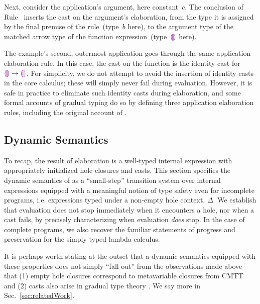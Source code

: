 Next, consider the application's argument, here constant~$c$.
%
The conclusion of Rule~ inserts the cast on the argument's
elaboration, from the type it is assigned by the final premise of the
rule~(type~$b$ here), to the argument type of the matched arrow type of the
function expression~(type~$\textcolor{violet}{\llparenthesis}\textcolor{violet}{\rrparenthesis}$ here).

The example's second, outermost application goes through the same
application elaboration rule.
%
In this case, the cast on the function is the identity cast for
$\textcolor{violet}{\llparenthesis}\textcolor{violet}{\rrparenthesis} \rightarrow \textcolor{violet}{\llparenthesis}\textcolor{violet}{\rrparenthesis}$.
%
For simplicity, we do not attempt to avoid the insertion of identity
casts in the core calculus; these will simply never fail during
evaluation.
%
However, it is safe in practice to eliminate such identity casts during
elaboration, and some formal accounts of gradual typing do so by defining
three application elaboration rules, including the original account of
\citet{Siek06a}.

\subsection{Dynamic Semantics}
\label{sec:evaluation}

To recap, the result of elaboration is a well-typed internal expression
with appropriately initialized hole closures and casts.  This section
specifies the dynamic semantics of \HazelnutLive as a ``small-step''
transition system over internal expressions equipped with a meaningful
notion of type safety even for incomplete programs, i.e. expressions typed
under a non-empty hole context, $\Delta$.  We establish that evaluation
does not stop immediately when it encounters a hole, nor when a cast fails,
by precisely characterizing when evaluation \emph{does} stop. In the case
of complete programs, we also recover the familiar statements of progress
and preservation for the simply typed lambda calculus.

It is perhaps worth stating at the outset that a dynamic semantics equipped
with these properties does not simply ``fall out'' from the observations
made above that (1) empty hole closures correspond to metavariable closures
from CMTT \cite{Nanevski2008} and (2) casts also arise in gradual type
theory \cite{DBLP:conf/snapl/SiekVCB15}.
%
We say more in Sec.~\ref{sec:relatedWork}.
%








